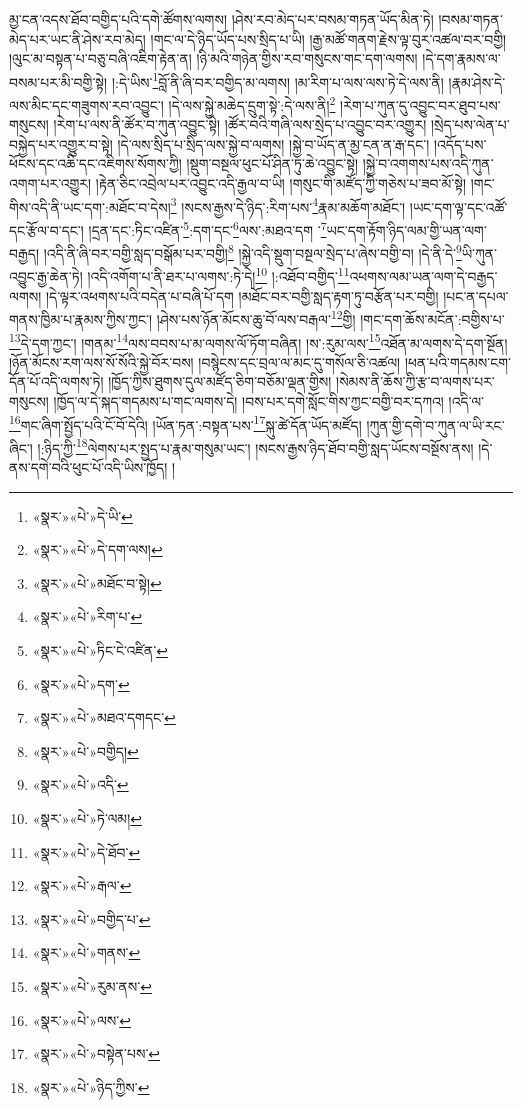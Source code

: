 མྱ་ངན་འདས་ཐོབ་བགྱིད་པའི་དགེ་ཚོགས་ལགས། །ཤེས་རབ་མེད་པར་བསམ་གཏན་ཡོད་མིན་ཏེ། །བསམ་གཏན་མེད་པར་ཡང་ནི་ཤེས་རབ་མེད། །གང་ལ་དེ་ཉིད་ཡོད་པས་སྲིད་པ་ཡི། །རྒྱ་མཚོ་གནག་རྗེས་ལྟ་བུར་འཚལ་བར་བགྱི། །ལུང་མ་བསྟན་པ་བཅུ་བཞི་འཇིག་རྟེན་ན། །ཉི་མའི་གཉེན་གྱིས་རབ་གསུངས་གང་དག་ལགས། །དེ་དག་རྣམས་ལ་བསམ་པར་མི་བགྱི་སྟེ། །:དེ་ཡིས་\footnote{«སྣར་»«པེ་»དེ་ཡི་}བློ་ནི་ཞི་བར་བགྱིད་མ་ལགས། །མ་རིག་པ་ལས་ལས་ཏེ་དེ་ལས་ནི། །རྣམ་ཤེས་དེ་ལས་མིང་དང་གཟུགས་རབ་འབྱུང་། །དེ་ལས་སྐྱེ་མཆེད་དྲུག་སྟེ་:དེ་ལས་ནི།\footnote{«སྣར་»«པེ་»དེ་དག་ལས།} །རེག་པ་ཀུན་དུ་འབྱུང་བར་ཐུབ་པས་གསུངས། །རེག་པ་ལས་ནི་ཚོར་བ་ཀུན་འབྱུང་སྟེ། །ཚོར་བའི་གཞི་ལས་སྲེད་པ་འབྱུང་བར་འགྱུར། །སྲེད་པས་ལེན་པ་བསྐྱེད་པར་འགྱུར་བ་སྟེ། །དེ་ལས་སྲིད་པ་སྲིད་ལས་སྐྱེ་བ་ལགས། །སྐྱེ་བ་ཡོད་ན་མྱ་ངན་ན་རྒ་དང་། །འདོད་པས་ཕོངས་དང་འཆི་དང་འཇིགས་སོགས་ཀྱི། །སྡུག་བསྔལ་ཕུང་པོ་ཤིན་ཏུ་ཆེ་འབྱུང་སྟེ། །སྐྱེ་བ་འགགས་པས་འདི་ཀུན་འགག་པར་འགྱུར། །རྟེན་ཅིང་འབྲེལ་པར་འབྱུང་འདི་རྒྱལ་བ་ཡི། །གསུང་གི་མཛོད་ཀྱི་གཅེས་པ་ཟབ་མོ་སྟེ། །གང་གིས་འདི་ནི་ཡང་དག་:མཐོང་བ་དེས།\footnote{«སྣར་»«པེ་»མཐོང་བ་སྟེ།} །སངས་རྒྱས་དེ་ཉིད་:རིག་པས་\footnote{«སྣར་»«པེ་»རིག་པ་}རྣམ་མཆོག་མཐོང་། །ཡང་དག་ལྟ་དང་འཚོ་དང་རྩོལ་བ་དང་། །དྲན་དང་:ཏིང་འཛིན་\footnote{«སྣར་»«པེ་»ཏིང་ངེ་འཛིན་}:དག་དང་\footnote{«སྣར་»«པེ་»དག་}ལས་:མཐའ་དག ་\footnote{«སྣར་»«པེ་»མཐའ་དགདང་}ཡང་དག་རྟོག་ཉིད་ལམ་གྱི་ཡན་ལག་བརྒྱད། །འདི་ནི་ཞི་བར་བགྱི་སླད་བསྒོམ་པར་བགྱི།\footnote{«སྣར་»«པེ་»བགྱིད།} །སྐྱེ་འདི་སྡུག་བསྔལ་སྲེད་པ་ཞེས་བགྱི་བ། །དེ་ནི་དེ་\footnote{«སྣར་»«པེ་»འདི་}ཡི་ཀུན་འབྱུང་རྒྱ་ཆེན་ཏེ། །འདི་འགོག་པ་ནི་ཐར་པ་ལགས་:ཏེ་དེ།\footnote{«སྣར་»«པེ་»ཏེ་ལམ།} །:འཐོབ་བགྱིད་\footnote{«སྣར་»«པེ་»དེ་ཐོབ་}འཕགས་ལམ་ཡན་ལག་དེ་བརྒྱད་ལགས། །དེ་ལྟར་འཕགས་པའི་བདེན་པ་བཞི་པོ་དག །མཐོང་བར་བགྱི་སླད་རྟག་ཏུ་བརྩོན་པར་བགྱི། །པང་ན་དཔལ་གནས་ཁྱིམ་པ་རྣམས་ཀྱིས་ཀྱང་། །ཤེས་པས་ཉོན་མོངས་ཆུ་བོ་ལས་བརྒལ་\footnote{«སྣར་»«པེ་»རྒལ་}གྱི། །གང་དག་ཆོས་མངོན་:བགྱིས་པ་\footnote{«སྣར་»«པེ་»བགྱིད་པ་}དེ་དག་ཀྱང་། །གནམ་\footnote{«སྣར་»«པེ་»གནས་}ལས་བབས་པ་མ་ལགས་ལོ་ཏོག་བཞིན། །ས་:རུམ་ལས་\footnote{«སྣར་»«པེ་»རུམ་ནས་}འཐོན་མ་ལགས་དེ་དག་སྔོན། །ཉོན་མོངས་རག་ལས་སོ་སོའི་སྐྱེ་བོར་བས། །བསྙེངས་དང་བྲལ་ལ་མང་དུ་གསོལ་ཅི་འཚལ། །ཕན་པའི་གདམས་ངག་དོན་པོ་འདི་ལགས་ཏེ། །ཁྱོད་ཀྱིས་ཐུགས་དུལ་མཛོད་ཅིག་བཅོམ་ལྡན་གྱིས། །སེམས་ནི་ཆོས་ཀྱི་རྩ་བ་ལགས་པར་གསུངས། །ཁྱོད་ལ་དེ་སྐད་གདམས་པ་གང་ལགས་དེ། །བས་པར་དགེ་སློང་གིས་ཀྱང་བགྱི་བར་དཀའ། །འདི་ལ་\footnote{«སྣར་»«པེ་»ལས་}གང་ཞིག་སྤྱོད་པའི་ངོ་བོ་དེའི། །ཡོན་ཏན་:བསྟན་པས་\footnote{«སྣར་»«པེ་»བསྟེན་པས་}སྐུ་ཚེ་དོན་ཡོད་མཛོད། །ཀུན་གྱི་དགེ་བ་ཀུན་ལ་ཡི་རང་ཞིང་། །:ཉིད་ཀྱི་\footnote{«སྣར་»«པེ་»ཉིད་ཀྱིས་}ལེགས་པར་སྤྱད་པ་རྣམ་གསུམ་ཡང་། །སངས་རྒྱས་ཉིད་ཐོབ་བགྱི་སླད་ཡོངས་བསྔོས་ནས། །དེ་ནས་དགེ་བའི་ཕུང་པོ་འདི་ཡིས་ཁྱོད། །
